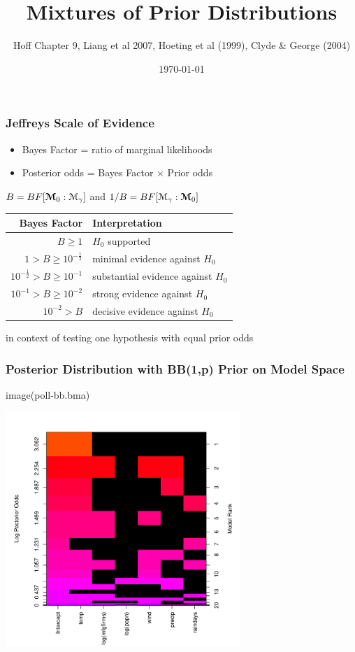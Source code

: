 \documentclass[]{beamer}
\title{Mixtures of Prior Distributions}
\author{Hoff Chapter 9, Liang et al 2007, Hoeting et al (1999), Clyde \&
 George (2004)}
\date{\today}
\begin{document}
\maketitle

\begin{frame}
\frametitle{Jeffreys Scale of Evidence}
\begin{itemize}
\item Bayes Factor = ratio of marginal likelihoods \pause

\item Posterior odds = Bayes Factor $\times$ Prior odds \pause

\end{itemize}


$B = BF[\boldsymbol{{\cal M}}_0 : {\cal M}_\gamma]$   and $1/B = BF[{\cal M}_\gamma : \boldsymbol{{\cal M}}_0]$ \pause

\vspace{14pt}

\begin{tabular}{|r|l|} \hline \hline
Bayes Factor & Interpretation \\ \hline
$B \geq 1$ & $H_0$ supported \\
$1 > B \geq 10^{-\frac{1}{2}} $ & minimal evidence against $H_0$ \\
$ 10^{- \frac{1}{2}} > B  \geq 10^{-1}$ & substantial evidence against $H_0$ \\
$ 10^{-1} > B  \geq 10^{-2}$ & strong evidence against $H_0$ \\
$ 10^{-2} > B $ & decisive evidence against $H_0$ \\ \hline \hline
\end{tabular}
\pause
in context of testing one hypothesis with equal prior odds
\end{frame}

\begin{frame}\frametitle{Posterior Distribution  with BB(1,p) Prior on Model Space}
image(poll-bb.bma)

\centering
\includegraphics[height=3.5in]{poll-bb-image}  
\end{frame}
\end{document}
